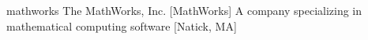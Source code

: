 \newglsXcompany%
{mathworks}%
{The MathWorks\textsuperscript{\textregistered}, Inc.}%
[MathWorks]%
{A company specializing in mathematical computing software \cite{website:Mathworks}}%
[Natick, MA]%